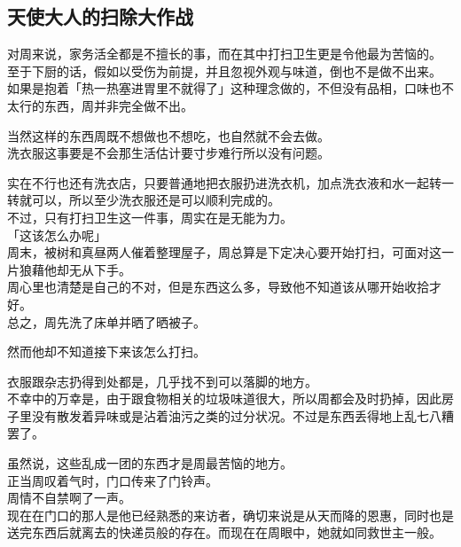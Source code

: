 \subsection{天使大人的扫除大作战}

对周来说，家务活全都是不擅长的事，而在其中打扫卫生更是令他最为苦恼的。\\

至于下厨的话，假如以受伤为前提，并且忽视外观与味道，倒也不是做不出来。\\

如果是抱着「热一热塞进胃里不就得了」这种理念做的，不但没有品相，口味也不太行的东西，周并非完全做不出。

当然这样的东西周既不想做也不想吃，也自然就不会去做。\\

洗衣服这事要是不会那生活估计要寸步难行所以没有问题。

实在不行也还有洗衣店，只要普通地把衣服扔进洗衣机，加点洗衣液和水一起转一转就可以，所以至少洗衣服还是可以顺利完成的。\\

不过，只有打扫卫生这一件事，周实在是无能为力。\\

「这该怎么办呢」\\

周末，被树和真昼两人催着整理屋子，周总算是下定决心要开始打扫，可面对这一片狼藉他却无从下手。\\

周心里也清楚是自己的不对，但是东西这么多，导致他不知道该从哪开始收拾才好。\\

总之，周先洗了床单并晒了晒被子。

然而他却不知道接下来该怎么打扫。

衣服跟杂志扔得到处都是，几乎找不到可以落脚的地方。\\

不幸中的万幸是，由于跟食物相关的垃圾味道很大，所以周都会及时扔掉，因此房子里没有散发着异味或是沾着油污之类的过分状况。不过是东西丢得地上乱七八糟罢了。

虽然说，这些乱成一团的东西才是周最苦恼的地方。\\

正当周叹着气时，门口传来了门铃声。\\

周情不自禁啊了一声。\\

现在在门口的那人是他已经熟悉的来访者，确切来说是从天而降的恩惠，同时也是送完东西后就离去的快递员般的存在。而现在在周眼中，她就如同救世主一般。


